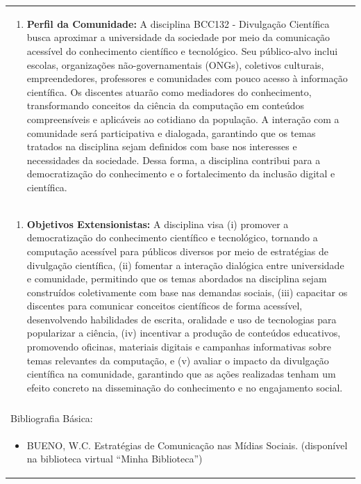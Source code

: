 \documentclass[11pt]{article}
\begin{document}
\begin{center}
\begin{longtable}{|p{4cm}|p{4cm}|p{4cm}|p{4cm}|}
\multicolumn{4}{|p{\dimexpr 16cm + 6\tabcolsep\relax}|}{\begin{enumerate}[start=6]\item \textbf{Perfil da Comunidade:} A disciplina BCC132 - Divulgação Científica busca aproximar a universidade da sociedade por meio da comunicação acessível do conhecimento científico e tecnológico. Seu público-alvo inclui escolas, organizações não-governamentais (ONGs), coletivos culturais, empreendedores, professores e comunidades com pouco acesso à informação científica. Os discentes atuarão como mediadores do conhecimento, transformando conceitos da ciência da computação em conteúdos compreensíveis e aplicáveis ao cotidiano da população. A interação com a comunidade será participativa e dialogada, garantindo que os temas tratados na disciplina sejam definidos com base nos interesses e necessidades da sociedade. Dessa forma, a disciplina contribui para a democratização do conhecimento e o fortalecimento da inclusão digital e científica.\end{enumerate}}\\
\multicolumn{4}{|p{\dimexpr 16cm + 6\tabcolsep\relax}|}{\begin{enumerate}[start=7]\item \textbf{Objetivos Extensionistas:} A disciplina visa (i) promover a democratização do conhecimento científico e tecnológico, tornando a computação acessível para públicos diversos por meio de estratégias de divulgação científica, (ii) fomentar a interação dialógica entre universidade e comunidade, permitindo que os temas abordados na disciplina sejam construídos coletivamente com base nas demandas sociais, (iii) capacitar os discentes para comunicar conceitos científicos de forma acessível, desenvolvendo habilidades de escrita, oralidade e uso de tecnologias para popularizar a ciência, (iv) incentivar a produção de conteúdos educativos, promovendo oficinas, materiais digitais e campanhas informativas sobre temas relevantes da computação, e (v) avaliar o impacto da divulgação científica na comunidade, garantindo que as ações realizadas tenham um efeito concreto na disseminação do conhecimento e no engajamento social.\end{enumerate}}\\
\multicolumn{4}{|p{\dimexpr 16cm + 6\tabcolsep\relax}|}{}\\
\hline
\multicolumn{4}{|p{16cm}|}{Bibliografia Básica:}\\*
\multicolumn{4}{|p{\dimexpr 16cm + 6\tabcolsep\relax}|}{\begin{itemize}\item BUENO, W.C. Estratégias de Comunicação nas Mídias Sociais. (disponível na biblioteca virtual “Minha Biblioteca”)\end{itemize}}\\

\end{longtable}
\end{center}
\end{document}
